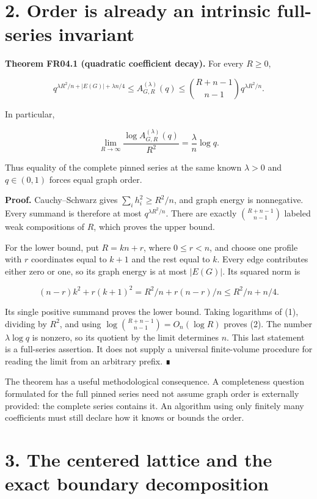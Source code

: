 \documentclass[
  11pt,
  a4paper,
]{report}
\begin{document}
\hypertarget{order-is-already-an-intrinsic-full-series-invariant}{%
\section{2. Order is already an intrinsic full-series
invariant}\label{order-is-already-an-intrinsic-full-series-invariant}}

\textbf{Theorem FR04.1 (quadratic coefficient decay).} For every
\(R\ge0\),

\[
 q^{\lambda R^2/n+|E(G)|+\lambda n/4}
 \le A_{G,R}^{(\lambda)}(q)
 \le \binom{R+n-1}{n-1}q^{\lambda R^2/n}.
 \tag{1}
\]

In particular,

\[
 \boxed{\displaystyle
 \lim_{R\to\infty}\frac{\log A_{G,R}^{(\lambda)}(q)}{R^2}
 =\frac{\lambda}{n}\log q.}
 \tag{2}
\]

Thus equality of the complete pinned series at the same known
\(\lambda>0\) and \(q\in(0,1)\) forces equal graph order.

\textbf{Proof.} Cauchy--Schwarz gives \(\sum_i h_i^2\ge R^2/n\), and
graph energy is nonnegative. Every summand is therefore at most
\(q^{\lambda R^2/n}\). There are exactly \(\binom{R+n-1}{n-1}\) labeled
weak compositions of \(R\), which proves the upper bound.

For the lower bound, put \(R=kn+r\), where \(0\le r<n\), and choose one
profile with \(r\) coordinates equal to \(k+1\) and the rest equal to
\(k\). Every edge contributes either zero or one, so its graph energy is
at most \(|E(G)|\). Its squared norm is

\[
 (n-r)k^2+r(k+1)^2
 =R^2/n+r(n-r)/n
 \le R^2/n+n/4.
\]

Its single positive summand proves the lower bound. Taking logarithms of
(1), dividing by \(R^2\), and using
\(\log\binom{R+n-1}{n-1}=O_n(\log R)\) proves (2). The number
\(\lambda\log q\) is nonzero, so its quotient by the limit determines
\(n\). This last statement is a full-series assertion. It does not
supply a universal finite-volume procedure for reading the limit from an
arbitrary prefix. ∎

The theorem has a useful methodological consequence. A completeness
question formulated for the full pinned series need not assume graph
order is externally provided: the complete series contains it. An
algorithm using only finitely many coefficients must still declare how
it knows or bounds the order.

\hypertarget{the-centered-lattice-and-the-exact-boundary-decomposition}{%
\section{3. The centered lattice and the exact boundary
decomposition}\label{the-centered-lattice-and-the-exact-boundary-decomposition}}
\end{document}
